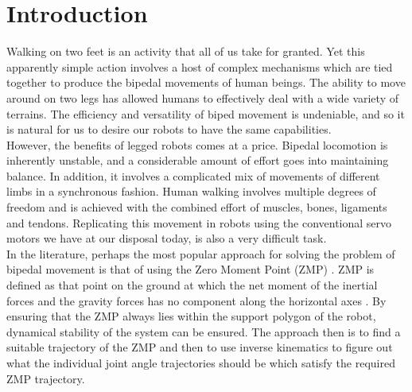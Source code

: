 \documentclass[12pt,twoside]{article}
\theoremstyle{plain}
\theoremstyle{definition}
\theoremstyle{remark}
\newcommand{\forceindent}{\leavevmode{\parindent=2em\indent}}
\begin{document}
\setcounter{tocdepth}{2} 					%
\tableofcontents
{}
\clearpage



\graphicspath{{images/}}

\section{Introduction}
\label{sec:introduction}
Walking on two feet is an activity that all of us take for granted. Yet this apparently simple action involves a host of complex mechanisms which are tied together to produce the bipedal movements of human beings. The ability to move around on two legs has allowed humans to effectively deal with a wide variety of terrains. The efficiency and versatility of biped movement is undeniable, and so it is natural for us to desire our robots to have the same capabilities.\\
\forceindent However, the benefits of legged robots comes at a price. Bipedal locomotion is inherently unstable, and a considerable amount of effort goes into maintaining balance. In addition, it involves a complicated mix of  movements of different limbs in a synchronous fashion. Human walking involves multiple degrees of freedom and is achieved with the combined effort of muscles, bones, ligaments and tendons. Replicating this movement in robots using the conventional servo motors we have at our disposal today, is also a very difficult task.\\
\forceindent In the literature, perhaps the most popular approach for solving the problem of bipedal movement is that of using the  Zero Moment Point (ZMP) \cite{vukobratovic1969contribution, jurivcic1972mathematical}. ZMP is defined as that point on the ground at which the net moment of the inertial forces and the gravity forces has no component along the horizontal axes \cite{vukobratovic2004zero}. By ensuring that the ZMP always lies within the support polygon of the robot, dynamical stability of the system can be ensured. The approach then is to find a suitable trajectory of the ZMP and then to use inverse kinematics to figure out what the individual joint angle trajectories should be which satisfy the required ZMP trajectory.\\
\end{document}
